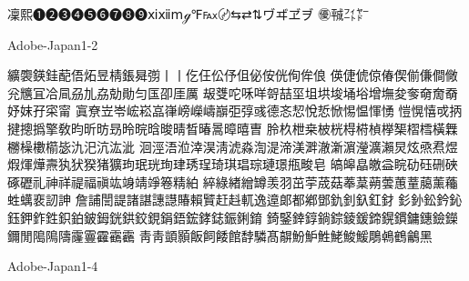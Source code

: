 凜熙❶❷❸❹❺❻❼❽❾ⅺⅻⅿℊ℉℻〄⇆⇄⇅ヷヸヹヺ
㊝㍻㌳㍎

Adobe-Japan1-2

纊褜鍈銈蓜俉炻昱棈鋹曻彅⼁丨仡仼伀伃伹佖侒侊侚侔俍
偀倢俿倞偆偰偂傔僴僘兊兤冝冾凬刕劜劦勀勛匀匤卲厓厲
叝﨎咜咊咩哿喆坙坥垬埈埇﨏增墲夋奓奛奝奣妤妺孖寀甯
寘尞岦岺峵崧嵓嵂嵭嶸嶹巐弡弴彧德忞恝悅悊惞惕愠惲愑
愷愰憘戓抦揵摠撝擎敎昀昕昉昮昤晥晗晙晴晳暙暠暲暿曺
朎杦枻桒柀桄棏﨓楨﨔榘槢樰橫橆橳橾櫢櫤毖氿汜沆汯泚
洄涇浯涖涬淏淸淲淼渹湜渧渼溿澈澵濵瀅瀇瀨炅炫焏焄煜
煆煇燁燾犱犾猤猪獷玽珉珖珣珒琇珵琦琪琩琮璉璟甁畯皂
皜皞皛皦益睆劯砡硎硤硺礰礼神祥禔福禛竑竧靖竫箞精絈
綷綠緖繒罇羡羽茁荢荿菇菶葈蒴蕓蕙蕫﨟薰蘒﨡蠇裵訒訷
詹誧誾諟諸諶譓譿賰賴贒赶﨣軏逸遧郞都鄕鄧釚釗釞釭釮
釤釥鈆鈐鈊鈺鉀鈼鉎鉙鉑鈹鉧銧鉷鉸鋧鋗鋙鋐﨧鋕鋠鋓錥
錡鋻﨨錞鋿錝錂鍰鍗鎤鏆鏞鏸鐱鑅鑈閒﨩隝隯霳霻靃靍靏
⾭靑顗顥飯飼餧館馞驎髙髜魵魲鮏鮱鮻鰀鵰鵫鶴鸙黑

Adobe-Japan1-4

